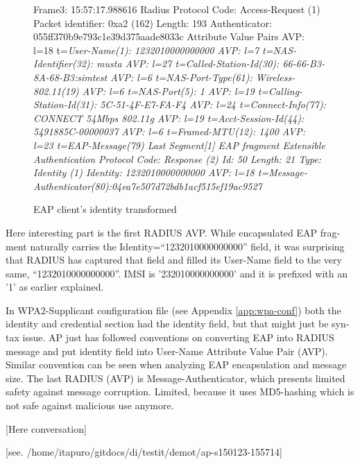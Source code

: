 \documentclass[12pt,a4paper,english]{tutthesis}
\begin{document}
\begin{otherlanguage}{english}
{\scriptsize
\begin{figure}
\caption{EAP client's identity transformed}
\label{fig:capture}
Frame3: 15:57:17.988616
Radius Protocol
    Code: Access-Request (1)
    Packet identifier: 0xa2 (162)
    Length: 193
    Authenticator: 055ff370b9e793c1e39d375aade8033c
    Attribute Value Pairs
        AVP: l=18 t=\em{User-Name(1): 1232010000000000}
        AVP: l=7 t=NAS-Identifier(32): musta
        AVP: l=27 t=Called-Station-Id(30): 66-66-B3-8A-68-B3:simtest
        AVP: l=6 t=NAS-Port-Type(61): Wireless-802.11(19)
        AVP: l=6 t=NAS-Port(5): 1
        AVP: l=19 t=Calling-Station-Id(31): 5C-51-4F-E7-FA-F4
        AVP: l=24 t=Connect-Info(77): CONNECT 54Mbps 802.11g
        AVP: l=19 t=Acct-Session-Id(44): 5491885C-00000037
        AVP: l=6 t=Framed-MTU(12): 1400
        AVP: l=23 t=EAP-Message(79) Last Segment[1]
            EAP fragment
            Extensible Authentication Protocol
                Code: Response (2)
                Id: 50
                Length: 21
                Type: Identity (1)
                Identity: 1232010000000000
        AVP: l=18 t=Message-Authenticator(80):04ea7e507d72bdb1acf515ef19ac9527
\end{figure}
\normalsize

Here interesting part is the first RADIUS AVP.
While encapsulated EAP fragment naturally carries the Identity=``1232010000000000''
field, it was surprising that RADIUS has captured that field and 
filled its User-Name field to the very same, ``1232010000000000''. 
IMSI is '232010000000000' and it is prefixed with
an '1' as earlier explained.

In WPA2-Supplicant configuration file (see Appendix \ref{app:wpa-conf}) both the identity and
credential section had the identity field, but that might 
just be syntax issue.
AP just has followed conventions on converting
EAP into RADIUS message and put identity field into User-Name
Attribute Value Pair (AVP).
Similar convention can be seen when analyzing EAP encapsulation and
message size. The last RADIUS (AVP) is 
Message-Authenticator, which presents limited safety against message 
corruption. Limited, because it uses MD5-hashing which is not safe
against malicious use anymore.

[Here conversation]



[see. /home/itapuro/gitdocs/di/testit/demot/ap-s150123-155714]

}
\end{otherlanguage}
\end{document}
